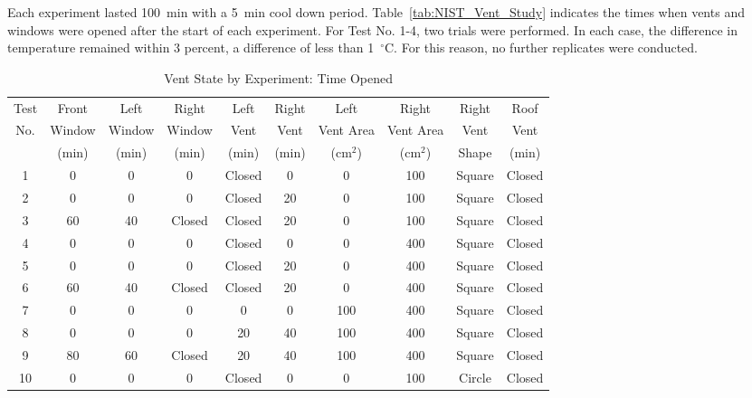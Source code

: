 Each experiment lasted 100~min with a 5~min cool down period. Table~\ref{tab:NIST_Vent_Study} indicates the times when vents and windows were opened after the start of each experiment. For Test No. 1-4, two trials were performed. In each case, the difference in temperature remained within 3 percent, a difference of less than 1~$^\circ$C. For this reason, no further replicates were conducted.

\begin{table}[h!]
\caption{Vent State by Experiment: Time Opened}
\begin{center}
\begin{tabular}{|c|c|c|c|c|c|c|c|c|c|}
\hline
Test & Front    & Left    & Right     & Left     & Right   & Left         & Right        & Right   & Roof    \\
No.  & Window   & Window  & Window    & Vent     & Vent    & Vent Area    & Vent Area    & Vent    & Vent    \\
     & (min)    & (min)   & (min)     & (min)    & (min)   & (cm$^2$)     & (cm$^2$)     & Shape   & (min)   \\ \hline \hline
1    & 0        &  0      &  0        &  Closed  &  0      &  0           &  100         &  Square & Closed  \\ \hline
2    & 0        &  0      &  0        &  Closed  &  20     &  0           &  100         &  Square & Closed  \\ \hline
3    & 60       &  40     &  Closed   &  Closed  &  20     &  0           &  100         &  Square & Closed  \\ \hline
4    & 0        &  0      &  0        &  Closed  &  0      &  0           & 400          &  Square & Closed  \\ \hline
5    & 0        &  0      &  0        &  Closed  &  20     &  0           &  400         &  Square & Closed  \\ \hline
6    & 60       &  40     &  Closed   &  Closed  &  20     &  0           &  400         &  Square & Closed  \\ \hline
7    &  0       &  0      &  0        &  0       &  0      &  100         &  400         &  Square & Closed  \\ \hline
8    &  0       &  0      &  0        &  20      &  40     &  100         &  400         &  Square & Closed  \\ \hline
9    &  80      &  60     &  Closed   &  20      &  40     &  100         &  400         &  Square & Closed  \\ \hline
10   &  0       &  0      &  0        &  Closed  &  0      &  0           &  100         & Circle  & Closed  \\ \hline

\end{tabular}
\end{center}
\end{table}
